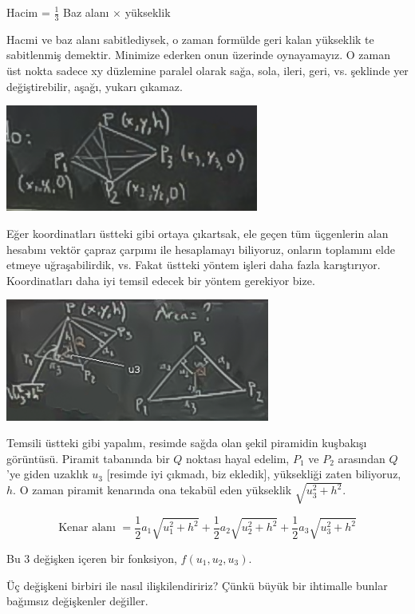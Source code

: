 \documentclass[12pt,fleqn]{article}\usepackage{../../common}
\begin{document}
Hacim = $\frac{1}{3}$ Baz alanı $\times$ yükseklik

Hacmi ve baz alanı sabitlediysek, o zaman formülde geri kalan yükseklik te
sabitlenmiş demektir. Minimize ederken onun üzerinde oynayamayız. O zaman
üst nokta sadece xy düzlemine paralel olarak sağa, sola, ileri, geri,
vs. şeklinde yer değiştirebilir, aşağı, yukarı çıkamaz. 

\begin{center}
\includegraphics[height=3.5cm]{13_9.png}
\end{center}

Eğer koordinatları üstteki gibi ortaya çıkartsak, ele geçen tüm üçgenlerin
alan hesabını vektör çapraz çarpımı ile hesaplamayı biliyoruz, onların
toplamını elde etmeye uğraşabilirdik, vs. Fakat üstteki yöntem işleri daha
fazla karıştırıyor. Koordinatları daha iyi temsil edecek bir yöntem
gerekiyor bize.

\begin{center}
\includegraphics[height=4cm]{13_10.png}
\end{center}

Temsili üstteki gibi yapalım, resimde sağda olan şekil piramidin kuşbakışı
görüntüsü. Piramit tabanında bir $Q$ noktası hayal edelim, $P_1$  ve $P_2$
arasından $Q$'ye giden uzaklık $u_3$ [resimde iyi çıkmadı, biz ekledik],
yüksekliği zaten biliyoruz, $h$. O zaman piramit kenarında ona tekabül eden
yükseklik $\sqrt{u_3^2 + h^2}$. 

$$ \textrm{Kenar alanı } = 
\frac{1}{2}a_1 \sqrt{u_1^2 + h^2} + 
\frac{1}{2}a_2 \sqrt{u_2^2 + h^2} + 
\frac{1}{2}a_3 \sqrt{u_3^2 + h^2} 
 $$

Bu 3 değişken içeren bir fonksiyon, $f(u_1,u_2,u_3)$. 

Üç değişkeni birbiri ile nasıl ilişkilendiririz? Çünkü büyük bir ihtimalle
bunlar bağımsız değişkenler değiller.
\end{document}
